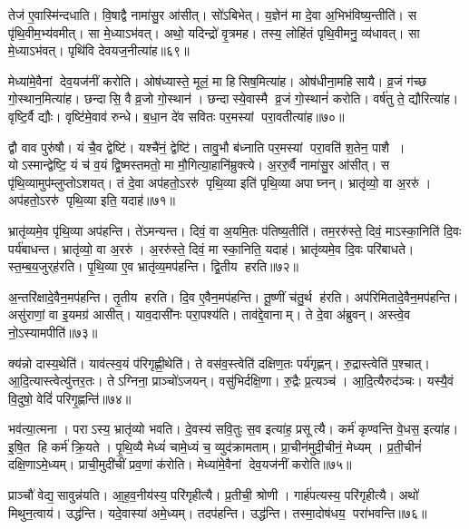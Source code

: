 तेज॑ ए॒वास्मि॑न्दधाति।
वि॒षाद्वै नामा॑सु॒र आ॑सीत्।
सो॑ऽबिभेत्।
य॒ज्ञेन॑ मा दे॒वा अ॒भिभ॑विष्य॒न्तीति॑।
स पृ॑थि॒वीम॒भ्य॑वमीत्।
सा मे॒ध्याऽभ॑वत्।
अथो॒ यदिन्द्रो॑ वृ॒त्रमह\sn{}।
तस्य॒ लोहि॑तं पृथि॒वीमनु॒ व्य॑धावत्।
सा मे॒ध्याऽभ॑वत्।
पृथि॑वि देवयज॒नीत्या॑ह॥६९॥

मेध्या॑मे॒वैनां देव॒यज॑नीं करोति।
ओष॑ध्यास्ते॒ मूलं॒ मा हिसिष॒मित्या॑ह।
ओष॑धीना॒महिसायै।
व्र॒जं ग॑च्छ गो॒स्थान॒मित्या॑ह।
छन्दासि॒ वै व्र॒जो गो॒स्थान॑।
छन्दास्ये॒वास्मै व्र॒जं गो॒स्थानं॑ करोति।
वर्\mbox{}ष॑तु ते॒ द्यौरित्या॑ह।
वृष्टि॒र्वै द्यौः।
वृष्टि॑मे॒वाव॑ रुन्धे।
ब॒धा॒न दे॑व सवितः पर॒मस्यां परा॒वतीत्या॑ह॥७०॥

द्वौ वाव पुरु॑षौ।
यं चै॒व द्वेष्टि॑।
यश्चै॑नं॒ द्वेष्टि॑।
तावु॒भौ ब॑ध्नाति पर॒मस्यां परा॒वति॑ श॒तेन॒ पाशै।
योऽस्मान्द्वेष्टि॒ यं च॑ व॒यं द्वि॒ष्मस्तमतो॒ मा मौ॒गित्या॒हानि॑म्रुक्त्ये।
अ॒ररु॒र्वै नामा॑सु॒र आ॑सीत्।
स पृ॑थि॒व्यामुप॑म्लुप्तोऽशयत्।
तं दे॒वा अप॑हतो॒ऽररु॑ पृथि॒व्या इति॑ पृथि॒व्या अपाघ्नन्।
भ्रातृ॑व्यो॒ वा अ॒ररु॑।
अप॑हतो॒ऽररु॑ पृथि॒व्या इति॒ यदाह॑॥७१॥

भ्रातृ॑व्यमे॒व पृ॑थि॒व्या अप॑हन्ति।
ते॑ऽमन्यन्त।
दिवं॒ वा अ॒यमि॒तः प॑तिष्य॒तीति॑।
तम॒ररु॑स्ते॒ दिवं॒ माऽस्का॒निति॑ दि॒वः पर्य॑बाधन्त।
भ्रातृ॑व्यो॒ वा अ॒ररु॑।
अ॒ररु॑स्ते॒ दिवं॒ मा स्का॒निति॒ यदाह॑।
भ्रातृ॑व्यमे॒व दि॒वः परि॑बाधते।
स्त॒म्ब॒य॒जुर्‌ह॑रति।
पृ॒थि॒व्या ए॒व भ्रातृ॑व्य॒मप॑हन्ति।
द्वि॒तीय हरति॥७२॥

अ॒न्तरि॑क्षादे॒वैन॒मप॑हन्ति।
तृ॒तीय हरति।
दि॒व ए॒वैन॒मप॑हन्ति।
तू॒ष्णीं च॑तु॒र्थ ह॑रति।
अप॑रिमितादे॒वैन॒मप॑हन्ति।
असु॑राणां॒ वा इ॒यमग्र॑ आसीत्।
याव॒दासी॑नः परा॒पश्य॑ति।
ताव॑द्दे॒वानाम्।
ते दे॒वा अ॑ब्रुवन्।
अस्त्वे॒व नो॒ऽस्यामपीति॑॥७३॥

क्य॑न्नो दास्य॒थेति॑।
याव॑त्स्व॒यं प॑रिगृह्णी॒थेति॑।
ते वस॑व॒स्त्वेति॑ दक्षिण॒तः पर्य॑गृह्णन्।
रु॒द्रास्त्वेति॑ प॒श्चात्।
आ॒दि॒त्यास्त्वेत्यु॑त्तर॒तः।
तेऽग्निना॒ प्राञ्चो॑ऽजयन्।
वसु॑भिर्दक्षि॒णा।
रु॒द्रैः प्र॒त्यञ्च॑।
आ॒दि॒त्यैरुद॑ञ्चः।
यस्यै॒वं वि॒दुषो॒ वेदिं॑ परिगृ॒ह्णन्ति॑॥७४॥

भव॑त्या॒त्मना।
पराऽस्य॒ भ्रातृ॑व्यो भवति।
दे॒वस्य॑ सवि॒तुः स॒व इत्या॑ह॒ प्रसूत्यै।
कर्म॑ कृण्वन्ति वे॒धस॒ इत्या॑ह।
इ॒षि॒त हि कर्म॑ क्रि॒यते।
पृ॒थि॒व्यै मेध्यं॑ चामे॒ध्यं च॒ व्युद॑क्रामताम्।
प्रा॒चीन॑मुदी॒चीनं॒ मेध्यम्।
प्र॒ती॒चीनं॑ दक्षि॒णाऽमे॒ध्यम्।
प्राची॒मुदी॑चीं प्रव॒णां क॑रोति।
मेध्या॑मे॒वैनां देव॒यज॑नीं करोति॥७५॥

प्राञ्चौ॑ वेद्य॒सावुन्न॑यति।
आ॒ह॒व॒नीय॑स्य॒ परि॑गृहीत्यै।
प्र॒तीची॒ श्रोणी।
गार्ह॑पत्यस्य॒ परि॑गृहीत्यै।
अथो॑ मिथुन॒त्वाय॑।
उद्ध॑न्ति।
यदे॒वास्या॑ अमे॒ध्यम्।
तदप॑हन्ति।
उद्ध॑न्ति।
तस्मा॒दोष॑धय॒ परा॑भवन्ति॥७६॥

